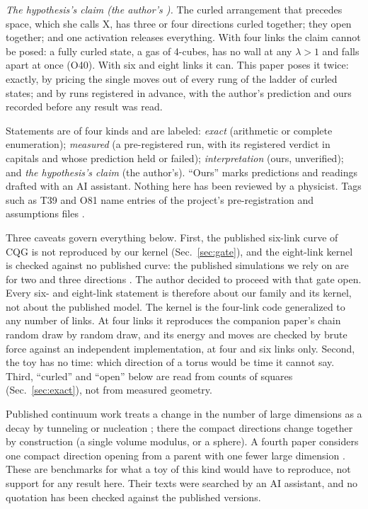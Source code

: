 \documentclass[aps,pre,10pt,twocolumn,superscriptaddress,nofootinbib]{revtex4-2}
\begin{document}
\emph{The hypothesis's claim (the author's \cite{repo}).} The curled arrangement that precedes space, which she
calls X, has three or four directions curled together; they open together; and one activation releases everything.
With four links the claim cannot be posed: a fully curled state, a gas of 4-cubes, has no wall at any $\lambda > 1$
and falls apart at once (O40). With six and eight links it can. This paper poses it twice: exactly, by pricing the
single moves out of every rung of the ladder of curled states; and by runs registered in advance, with the author's
prediction and ours recorded before any result was read.

Statements are of four kinds and are labeled: \emph{exact} (arithmetic or complete enumeration); \emph{measured}
(a pre-registered run, with its registered verdict in capitals and whose prediction held or failed);
\emph{interpretation} (ours, unverified); and \emph{the hypothesis's claim} (the author's). ``Ours'' marks
predictions and readings drafted with an AI assistant. Nothing here has been reviewed by a physicist. Tags such as
T39 and O81 name entries of the project's pre-registration and assumptions files \cite{repo}.

Three caveats govern everything below. First, the published six-link curve of CQG \cite{T22} is not reproduced by
our kernel (Sec.~\ref{sec:gate}), and the eight-link kernel is checked against no published curve: the published
simulations we rely on are for two and three directions \cite{KTB19,T22}. The author decided to proceed with that
gate open. Every six- and eight-link statement is therefore about our family and its kernel, not about the published
model. The kernel is the four-link code generalized to any number of links. At four links it reproduces the
companion paper's chain random draw by random draw, and its energy and moves are checked by brute force against an
independent implementation, at four and six links only. Second, the toy has no time: which direction of a torus would
be time it cannot say. Third, ``curled'' and ``open'' below are read from counts of squares (Sec.~\ref{sec:exact}),
not from measured geometry.

Published continuum work treats a change in the number of large dimensions as a decay by tunneling or nucleation
\cite{GM04,CJR09,BSV10}; there the compact directions change together by construction (a single volume modulus, or a
sphere). A fourth paper considers one compact direction opening from a parent with one fewer large dimension
\cite{GHR10}. These are benchmarks for what a toy of this kind would have to reproduce, not support for any result
here. Their texts were searched by an AI assistant, and no quotation has been checked against the published versions.
\end{document}
